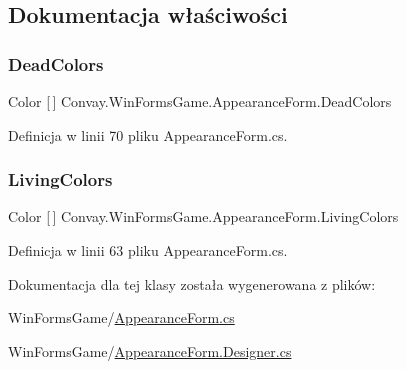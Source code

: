 \subsection{Dokumentacja właściwości}
\hypertarget{class_convay_1_1_win_forms_game_1_1_appearance_form_a348f1dddaf9f690022fe8975a6f3f3f9}{}\label{class_convay_1_1_win_forms_game_1_1_appearance_form_a348f1dddaf9f690022fe8975a6f3f3f9} 
\subsubsection{\texorpdfstring{Dead\+Colors}{DeadColors}}
{\footnotesize\ttfamily Color \mbox{[}$\,$\mbox{]} Convay.\+Win\+Forms\+Game.\+Appearance\+Form.\+Dead\+Colors\hspace{0.3cm}{\ttfamily [get]}}



Definicja w linii 70 pliku Appearance\+Form.\+cs.

\hypertarget{class_convay_1_1_win_forms_game_1_1_appearance_form_a1482f329de8b8cd0dda0ff5e8fa37567}{}\label{class_convay_1_1_win_forms_game_1_1_appearance_form_a1482f329de8b8cd0dda0ff5e8fa37567} 
\subsubsection{\texorpdfstring{Living\+Colors}{LivingColors}}
{\footnotesize\ttfamily Color \mbox{[}$\,$\mbox{]} Convay.\+Win\+Forms\+Game.\+Appearance\+Form.\+Living\+Colors\hspace{0.3cm}{\ttfamily [get]}}



Definicja w linii 63 pliku Appearance\+Form.\+cs.



Dokumentacja dla tej klasy została wygenerowana z plików\+:\begin{DoxyCompactItemize}
\item 
Win\+Forms\+Game/\hyperlink{_appearance_form_8cs}{Appearance\+Form.\+cs}\item 
Win\+Forms\+Game/\hyperlink{_appearance_form_8_designer_8cs}{Appearance\+Form.\+Designer.\+cs}\end{DoxyCompactItemize}
